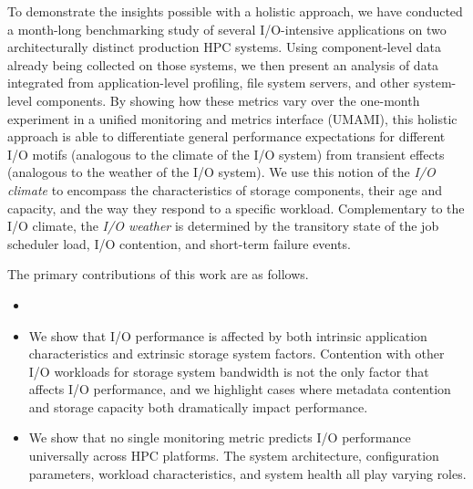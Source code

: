 To demonstrate the insights possible with a holistic approach, we have conducted a month-long benchmarking study of several I/O-intensive applications on two architecturally distinct production HPC systems.
Using component-level data already being collected on those systems, we then present an analysis of data integrated from application-level profiling, file system servers, and other system-level components.
By showing how these metrics vary over the one-month experiment in a unified monitoring and metrics interface (UMAMI), this holistic approach is able to differentiate general performance expectations for different I/O motifs (analogous to the climate of the I/O system) from transient effects (analogous to the weather of the I/O system).
We use this notion of the \emph{I/O climate} to encompass the characteristics of storage components, their age and capacity, and the way they respond to a specific workload.
Complementary to the I/O climate, the \emph{I/O weather} is determined by the transitory state of the job scheduler load, I/O contention, and short-term failure events.

The primary contributions of this work are as follows.

\begin{itemize}[leftmargin=*]

\item {}

\item We show that I/O performance is affected by both intrinsic application characteristics and extrinsic storage system factors.
Contention with other I/O workloads for storage system bandwidth is not the only factor that affects I/O performance, and
we highlight cases where metadata contention and storage capacity both dramatically impact performance.

\item We show that no single monitoring metric predicts I/O performance universally across HPC platforms.
The system architecture, configuration parameters, workload characteristics,
and system health all play varying roles.

\end{itemize}

